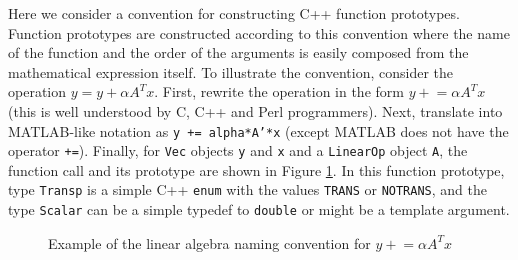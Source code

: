 \documentclass[acmtoms,acmnow]{acmtrans2m}
\begin{document}
Here we consider a convention for constructing C++ function prototypes.
Function prototypes are constructed according to this convention where the
name of the function and the order of the arguments is easily composed from
the mathematical expression itself.  To illustrate the convention, consider
the operation $y = y + \alpha A^T x$.  First, rewrite the operation in the
form $y +\!= \alpha A^T x$ (this is well understood by C, C++ and Perl
programmers).  Next, translate into MATLAB-like notation as {}\texttt{y +=
alpha*A'*x} (except MATLAB does not have the operator {}\texttt{+=}).
Finally, for {}\texttt{Vec} objects {}\texttt{y} and {}\texttt{x} and a
{}\texttt{LinearOp} object {}\texttt{A}, the function call and its prototype are
shown in Figure {}\ref{rsqppp:fig:example_linalgpack_convention}.  In this
function prototype, type {}\texttt{Transp} is a simple C++ {}\texttt{enum}
with the values {}\texttt{TRANS} or {}\texttt{NOTRANS}, and the type
{}\texttt{Scalar} can be a simple typedef to {}\texttt{double} or might be a
template argument.

{\bsinglespace
\begin{figure}
\caption[Example of naming convention for functions for linear algebra function]{
\label{rsqppp:fig:example_linalgpack_convention}
Example of the linear algebra naming convention for $y +\!\!= \alpha A^T x$
}
\end{figure}
\esinglespace}
\end{document}
